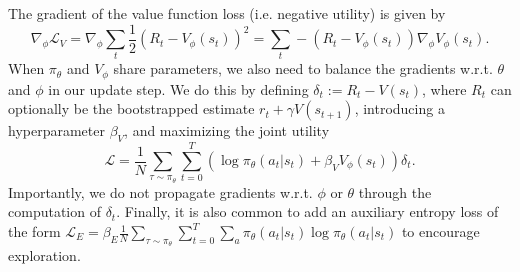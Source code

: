 The gradient of the value function loss (i.e. negative utility) is given by
\begin{equation}
    \nabla_\phi \mathcal{L}_V = \nabla_\phi \sum_t \frac12  (R_t - V_\phi(s_t))^2 = \sum_t - (R_t - V_\phi(s_t)) \nabla_\phi V_\phi(s_t).
\end{equation}
When $\pi_\theta$ and $V_\phi$ share parameters, we also need to balance the gradients w.r.t. $\theta$ and $\phi$ in our update step.
We do this by defining $\delta_t := R_t - V(s_t)$, where $R_t$ can optionally be the bootstrapped estimate $r_t + \gamma V(s_{t+1})$, introducing a hyperparameter $\beta_V$, and maximizing the joint utility
\begin{equation}
    \mathcal{L} = \frac{1}{N} \sum_{\tau \sim \pi_\theta} \sum_{t=0}^T ( \log \pi_\theta (a_t|s_t) + \beta_V V_\phi(s_t) ) \delta_t .
\end{equation}
Importantly, we do not propagate gradients w.r.t. $\phi$ or $\theta$ through the computation of $\delta_t$.
Finally, it is also common to add an auxiliary entropy loss of the form $\mathcal{L}_E = \beta_E \frac{1}{N} \sum_{\tau \sim \pi_\theta} \sum_{t=0}^T \sum_a \pi_\theta (a_t|s_t) \log \pi_\theta (a_t|s_t)$ to encourage exploration.




